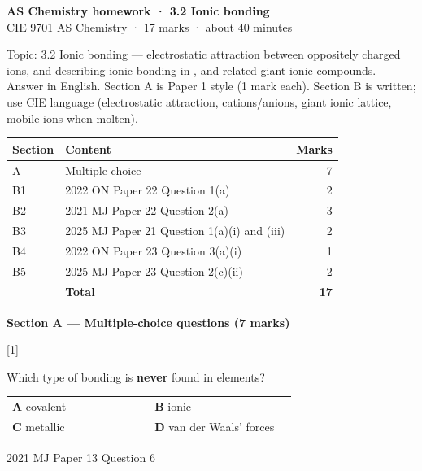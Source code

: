\documentclass[10pt,a4paper]{article}
\newcommand{\homeworktitle}{Chemistry homework}
\newcommand{\homeworkmarks}{}
\newcommand{\sethomework}[2]{%
  \renewcommand{\homeworktitle}{#1}%
  \renewcommand{\homeworkmarks}{#2}%
}
\newcommand{\qhead}[2]{%
  \par\vspace{0.28em}%
  \Needspace{4.2em}%
  \noindent{\small\textbf{#1}}\hfill{\small[#2]}\par\vspace{0.08em}%
}
\newcommand{\sourcefoot}[1]{%
  {\footnotesize\color{gray}#1}\par
}
\begin{document}
\sethomework{AS Chemistry homework · 3.2 Ionic bonding}{17 marks}

\begin{center}
{\large\bfseries AS Chemistry homework · 3.2 Ionic bonding}\\[0.12em]
{\small CIE 9701 AS Chemistry · 17 marks · about 40 minutes}
\end{center}

{\small Topic: 3.2 Ionic bonding --- electrostatic attraction between oppositely charged ions, and describing ionic bonding in ,  and related giant ionic compounds.
Answer in English. Section A is Paper 1 style (1 mark each). Section B is written; use CIE language (electrostatic attraction, cations/anions, giant ionic lattice, mobile ions when molten).}

\vspace{0.15em}
{\small
\begin{tabular}{@{}llr@{}}
\toprule
\textbf{Section} & \textbf{Content} & \textbf{Marks} \\
\midrule
A & Multiple choice & 7 \\
B1 & 2022 ON Paper 22 Question 1(a) & 2 \\
B2 & 2021 MJ Paper 22 Question 2(a) & 3 \\
B3 & 2025 MJ Paper 21 Question 1(a)(i) and (iii) & 2 \\
B4 & 2022 ON Paper 23 Question 3(a)(i) & 1 \\
B5 & 2025 MJ Paper 23 Question 2(c)(ii) & 2 \\
\midrule
 & \textbf{Total} & \textbf{17} \\
\bottomrule
\end{tabular}}

\vspace{0.25em}
{\large\bfseries Section A --- Multiple-choice questions (7 marks)}\par

\qhead{A1.}{1}
{\small Which type of bonding is \textbf{never} found in elements?}
\par\vspace{0.08em}
{\small
\begin{tabular}{@{}p{0.46\linewidth}p{0.46\linewidth}@{}}
\textbf{A} covalent & \textbf{B} ionic \\[0.15em]
\textbf{C} metallic & \textbf{D} van der Waals' forces
\end{tabular}}
\par
\sourcefoot{2021 MJ Paper 13 Question 6}
\end{document}

